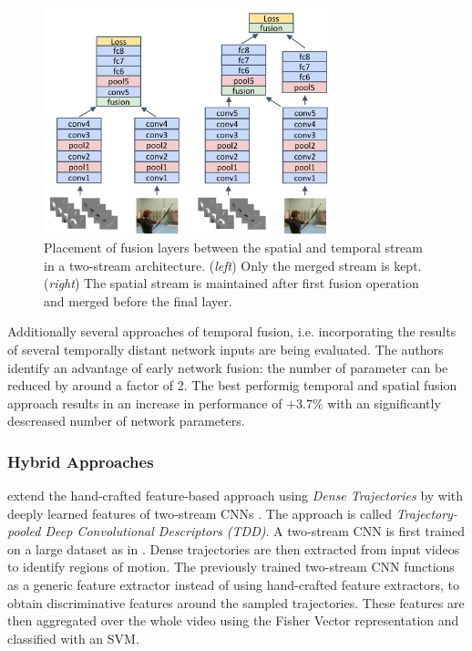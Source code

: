 \begin{figure}[H]
    \centering
    \includegraphics[width=0.75\textwidth]{img_related/streamfusion_layerplacement}
    \caption{  \cite{feichtenhofer_convolutional_2016}}
    \caption{Placement of fusion layers between the spatial and temporal stream in a two-stream architecture. (\textit{left}) Only the merged stream is kept. (\textit{right}) The spatial stream is maintained after first fusion operation and merged before the final layer. \cite{feichtenhofer_convolutional_2016}}
    \label{fig:streamfusion_layerplacement}
\end{figure}

Additionally several approaches of temporal fusion, i.e. incorporating the results of several temporally distant network inputs are being evaluated.
The authors identify an advantage of early network fusion: the number of parameter can be reduced by around a factor of 2.
The best performig temporal and spatial fusion approach results in an increase in performance of $+3.7\%$ with an significantly descreased number of network parameters.


\subsubsection{Hybrid Approaches}
\textcite{wang_action_2015} extend the hand-crafted feature-based approach using \textit{Dense Trajectories} by \textcite{wang_action_2013} with deeply learned features of two-stream CNNs \cite{simonyan_two-stream_2014}.
The approach is called \textit{Trajectory-pooled Deep Convolutional Descriptors (TDD)}.
A two-stream CNN is first trained on a large dataset as in \cite{simonyan_two-stream_2014}.
Dense trajectories are then extracted from input videos \cite{wang_action_2013} to identify regions of motion.
The previously trained two-stream CNN functions as a generic feature extractor instead of using hand-crafted feature extractors, to obtain discriminative features around the sampled trajectories.
These features are then aggregated over the whole video using the Fisher Vector representation \cite{sanchez_image_2013} and classified with an SVM.

